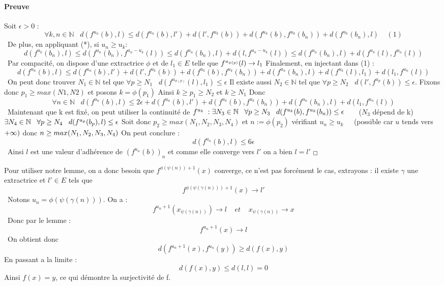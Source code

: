 \documentclass{article}
\begin{document}
\paragraph{Preuve}
Soit $\epsilon > 0$ : \[\ 
   \forall k,n\in \mathbb{N} \;\;\; d(f^{u_n}(b),l) \leq d(f^{u_n}(b),l') + d(l',f^{u_k}(b))  + d(f^{u_k}(b),f^{u_k}(b_n))+d(f^{u_k}(b_n),l) \;\;\;\;(1)\]\ De plus, en appliquant (*), si $u_n \geq u_k$:  
\[\  d(f^{u_k}(b_n),l) \leq d(f^{u_n}(b_n),f^{u_n-u_k}(l)) \leq d(f^{u_n}(b_n),l) + d(l,f^{u_n-u_k}(l))  \leq d(f^{u_n}(b_n),l) + d(f^{u_k}(l),f^{u_n}(l)) \]\
Par compacité, on dispose d'une extractrice $\phi$ et de $l_1 \in E$ telle que $f^{u_{\phi(p)}}(l)  \rightarrow l_1 \\ $
Finalement, en injectant dans (1) : \[\ d(f^{u_n}(b),l) \leq d(f^{u_n}(b),l') + d(l',f^{u_k}(b))  + d(f^{u_k}(b),f^{u_k}(b_n))+ d(f^{u_n}(b_n),l) + d(f^{u_k}(l),l_1) + d(l_1,f^{u_n}(l)) \]\
On peut donc  trouver $N_1 \in \mathbb{N} $ tel que $\forall p \geq N_1 \;\;\;d(f^{u_{\phi(p)}}(l),l_1) \leq \epsilon $ Il existe aussi $N_2 \in \mathbb{N} $ tel que $\forall p \geq N_2 \;\;\;d(l',f^{u_p}(b)) \leq \epsilon$. Fixons donc $ p_1 \geq max(N1,N2) $ et posons $ k = \phi(p_1) $ Ainsi $k \geq p_1 \geq N_2 $ et $k\geq N_1$ Donc \[\ \forall n \in \mathbb{N}\;\;\; d(f^{u_n}(b),l) \leq 2\epsilon + d(f^{u_n}(b),l')   + d(f^{u_k}(b),f^{u_k}(b_n))+ d(f^{u_n}(b_n),l) +  d(l_1,f^{u_n}(l)) \]\ Maintenant que k est fixé, on peut utiliser la continuité de $f^{u_k} \; : \;\\ \exists N_3 \in \mathbb{N} \;\;\; \forall p \geq N_3\;\;\; d(f^{u_k}(b),f^{u_k}(b_n)) \leq \epsilon \;\;\;\;\;\;  $ ($N_3$ dépend de k)$
\\ \exists N_4 \in \mathbb{N} \;\;\; \forall p \geq N_4\;\;\; d(f^{u_p}(b_p),l) \leq \epsilon \\ \\$ Soit donc $p_2 \geq max(N_1,N_2,N_3,N_4)$ et $n := \phi(p_2)  $ vérifiant $u_n \geq u_k \;\;\;\; $ (possible car $u$ tends vers $+\infty) \\ $ donc $ n \geq max(N_1,N_2,N_3,N_4) \\ $ On peut conclure : \[\  d(f^{u_n}(b),l) \leq 6\epsilon\]\ Ainsi $l$ est une valeur d'adhérence de $(f^{u_n}(b))_n$ et comme elle converge vers $l'$ on a bien $l=l'$ $_\Box \\ \\$

Pour utiliser notre lemme, on a donc besoin que $f^{\phi(\psi(n))+1}(x)$ converge, ce n'est pas forcément le cas, extrayons : il existe $ \gamma $ une extractrice et $l' \in E$ tels que \[\ f^{\phi(\psi(\gamma(n)))+1}(x) \rightarrow l' \]\ Notons $u_n = \phi(\psi(\gamma(n)))$. On a : \[\ f^{u_n+1}(x_{\psi(\gamma(n))}) \rightarrow l \;\;\;\; et \;\;\;\; x_{\psi(\gamma(n))} \rightarrow x\]\ Donc par le lemme : \[\ f^{u_n+1}(x) \rightarrow l \]\ On obtient donc \[\ d(f^{u_n + 1}(x),f^{u_n}(y)) \geq d(f(x),y) \] En passant a la limite : \[\ d(f(x),y) \leq d(l,l) = 0 \] Ainsi $f(x) = y $, ce qui démontre la surjectivité de f.  \[\ \]
\end{document}
